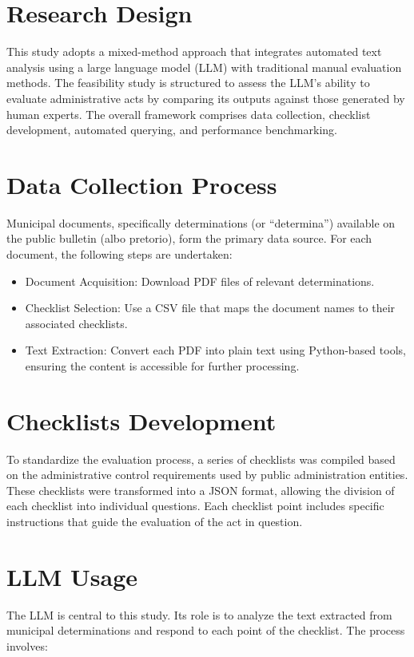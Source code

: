 \documentclass[../main.tex]{subfiles}
\begin{document}
\section*{Research Design}
This study adopts a mixed-method approach that integrates automated text analysis using a large language model (LLM) with traditional manual evaluation methods. The feasibility study is structured to assess the LLM's ability to evaluate administrative acts by comparing its outputs against those generated by human experts. The overall framework comprises data collection, checklist development, automated querying, and performance benchmarking.


\section*{Data Collection Process}
Municipal documents, specifically determinations (or “determina”) available on the public bulletin (albo pretorio), form the primary data source. For each document, the following steps are undertaken:

\begin{itemize}
    \item Document Acquisition: Download PDF files of relevant determinations.
    \item Checklist Selection: Use a CSV file that maps the document names to their associated checklists.
    \item Text Extraction: Convert each PDF into plain text using Python-based tools, ensuring the content is accessible for further processing.
\end{itemize}

\section*{Checklists Development}
To standardize the evaluation process, a series of checklists was compiled based on the administrative control requirements used by public administration entities. These checklists were transformed into a JSON format, allowing the division of each checklist into individual questions. Each checklist point includes specific instructions that guide the evaluation of the act in question.

\section*{LLM Usage}
The LLM is central to this study. Its role is to analyze the text extracted from municipal determinations and respond to each point of the checklist. The process involves:
\end{document}
